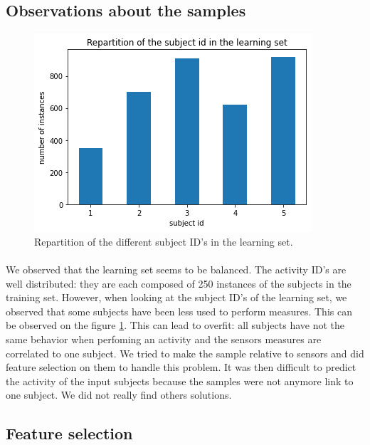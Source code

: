 \documentclass[a4paper, 11pt, oneside]{article}
\begin{document}
\subsection{Observations about the samples}

\begin{figure}[H]
\center
\includegraphics[scale = 0.5]{preprocessing/subjects_repartition.png}
\caption{Repartition of the different subject ID's in the learning set.}
\label{subject_repartition}
\end{figure}

\paragraph{}We observed that the learning set seems to be balanced. The activity ID's are well distributed: they are each composed of 250 instances of the subjects in the training set. However, when looking at the subject ID's of the learning set, we observed that some subjects have been less used to perform measures. This can be observed on the figure \ref{subject_repartition}.
This can lead to overfit: all subjects have not the same behavior when perfoming an activity and the sensors measures are correlated to one subject. We tried to make the sample relative to sensors and did feature selection on them to handle this problem. It was then difficult to predict the activity of the input subjects because the samples were not anymore link to one subject. We did not really find others solutions.

\subsection{Feature selection}
\end{document}
